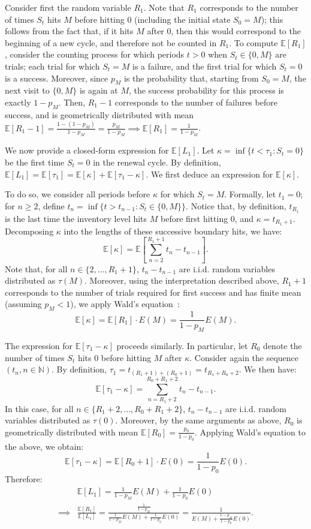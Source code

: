 \documentclass[mnsc,nonblindrev]{informs3}
\newcommand{\E}{\mathbb{E}}
\renewenvironment{proof}[1][Proof]{%
  \par\noindent{\itshape #1.} \ignorespaces
}{%
  \hfill\Halmos\par
}
\begin{document}
\begin{APPENDICES}
\begin{proof}
Consider first the random variable $R_1$. Note that $R_1$ corresponds to the number of times $S_t$ hits $M$ before hitting 0 (including the initial state $S_0 = M$); this follows from the fact that, if it hits $M$ after 0, then this would correspond to the beginning of a new cycle, and therefore not be counted in $R_1$. To compute $\mathbb{E}[R_1]$, consider the counting process for which periods $t > 0$ when $S_t \in \{0,M\}$ are trials; each trial for which $S_t = M$ is a failure, and the first trial for which $S_t = 0$ is a success. Moreover, since $p_{M}$ is the probability that, starting from $S_{0}=M$, the next visit to $\{0,M\}$ is again at $M$, the success probability for this process is exactly $1-p_M$. Then, $R_1-1$ corresponds to the number of failures before success, and is geometrically distributed with mean $\E[R_1-1] = \frac{1-(1-p_M)}{1-p_M} = \frac{p_M}{1-p_M} \implies \E[R_1] = \frac{1}{1-p_M}$.

We now provide a closed-form expression for $\E[L_1]$. Let $\kappa = \inf\{t < \tau_1: S_t = 0\}$ be the first time $S_t = 0$ in the renewal cycle. 
By definition, $\E[L_1] = \E[\tau_1] = \E[\kappa] + \E[\tau_1 - \kappa ]$. We first deduce an expression for $\E[\kappa]$.

To do so, we consider all periods before $\kappa$ for which $S_t = M$. Formally, let $t_1 = 0$; for $n \geq 2$, define $t_n = \inf\{t > t_{n-1}: S_t \in \{0,M\}\}$. Notice that, by definition, $t_{R_1}$ is the last time the inventory level hits $M$ before first hitting 0, and $\kappa = t_{R_1+1}$. Decomposing $\kappa$ into the lengths of these successive boundary hits, we have:
$$\E[\kappa] = \E\left[\sum_{n=2}^{R_1+1}t_n - t_{n-1}\right].$$
Note that, for all $n \in \{2,\ldots,R_1+1\}$, $t_n - t_{n-1}$ are i.i.d. random variables distributed as $\tau(M)$. Moreover, using the interpretation described above, $R_1+1$ corresponds to the number of trials required for first success and has finite mean (assuming $p_M < 1$), {we apply Wald's equation~\citep[Proposition 1.8.1]{resnick2013adventures}:}
\[\E[\kappa] = \E[R_1]\cdot E(M) = \frac{1}{1-p_M} E(M).\]

The expression for $\E[\tau_1-\kappa]$ proceeds similarly. In particular, let $R_0$ denote the number of times $S_t$ hits 0 before hitting $M$ after $\kappa$. Consider again the sequence $(t_n, n\in\mathbb{N})$. By definition, $\tau_1 = t_{(R_1+1)+(R_0+1)} = t_{R_1+R_0+2}$. We then have: 
\[\E[\tau_1-\kappa] = \sum_{n=R_1+2}^{R_0+R_1+2}t_n-t_{n-1}.\]
In this case, for all $n \in \{R_1+2, \ldots ,R_0+R_1+2\}$, $t_n - t_{n-1}$ are i.i.d. random variables distributed as $\tau(0)$. Moreover, by the same arguments as above, $R_0$ is geometrically distributed with mean $\E[R_0] = \frac{p_0}{1-p_0}$. Applying Wald's equation to the above, we obtain:
\[\E[\tau_1-\kappa] = \E[R_0+1]\cdot E(0) = \frac{1}{1-p_0} E(0).\]
Therefore:
\begin{align*}
&\E[L_1] = \frac{1}{1-p_M} E(M) +\frac{1}{1-p_0} E(0)\\ \implies &\frac{\E[R_1]}{\E[L_1]} = \frac{\frac{1}{1-p_M}}{\frac{1}{1-p_M} E(M) +\frac{1}{1-p_0} E(0)} = \frac{1}{E(M) + \frac{1-p_M}{1-p_0}E(0)}.
\end{align*}


\end{proof}
\end{APPENDICES}
\end{document}
